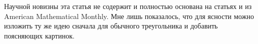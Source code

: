 \documentclass[12pt]{article} %
\theoremstyle{definition} %
\begin{document}
Научной новизны эта статья не содержит и полностью основана на статьях \autocite{klain2020probabilistic} и \autocite{welzl1994gram} из American Mathematical Monthly.
Мне лишь показалось, что для ясности можно изложить ту же идею сначала для обычного треугольника
и добавить поясняющих картинок.





\printbibliography[heading=none]
\end{document}
